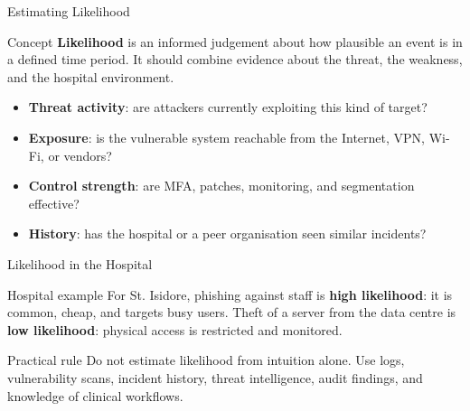 \documentclass[presentation]{beamer}
\begin{document}
\begin{frame}[c]{Estimating Likelihood}
\begin{block}{Concept}
\textbf{Likelihood} is an informed judgement about how plausible an event is in a defined time
period. It should combine evidence about the threat, the weakness, and the hospital environment.
\end{block}

\begin{itemize}
    \item \textbf{Threat activity}: are attackers currently exploiting this kind of target?
    \item \textbf{Exposure}: is the vulnerable system reachable from the Internet, VPN, Wi-Fi, or vendors?
    \item \textbf{Control strength}: are MFA, patches, monitoring, and segmentation effective?
    \item \textbf{History}: has the hospital or a peer organisation seen similar incidents?
\end{itemize}
\end{frame}

\begin{frame}[c]{Likelihood in the Hospital}
\begin{exampleblock}{Hospital example}
For St. Isidore, phishing against staff is \textbf{high likelihood}: it is common, cheap, and targets
busy users. Theft of a server from the data centre is \textbf{low likelihood}: physical access is
restricted and monitored.
\end{exampleblock}

\begin{block}{Practical rule}
Do not estimate likelihood from intuition alone. Use logs, vulnerability scans, incident history,
threat intelligence, audit findings, and knowledge of clinical workflows.
\end{block}
\end{frame}
\end{document}
